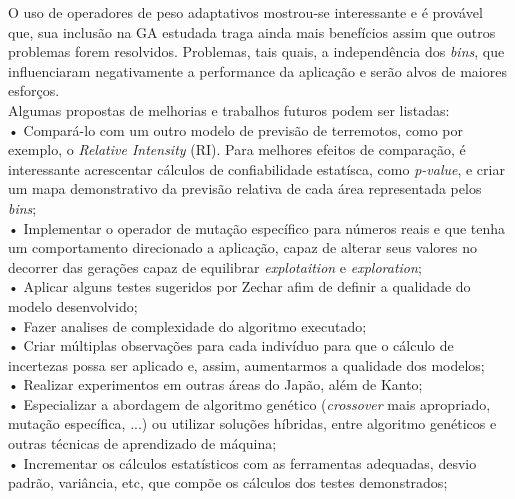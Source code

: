 O uso de operadores de peso adaptativos mostrou-se interessante e é provável que, sua inclusão na GA estudada traga ainda mais benefícios assim que outros problemas forem resolvidos. Problemas, tais quais, a independência dos {\it bins}, que influenciaram negativamente a performance da aplicação e serão alvos de maiores esforços.\\



Algumas propostas de melhorias e trabalhos futuros podem ser listadas:\\

• Compará-lo com um outro modelo de previsão de terremotos, como por exemplo, o {\it Relative Intensity} (RI). Para melhores efeitos de comparação, é interessante acrescentar cálculos de confiabilidade estatísca, como {\it p-value}, e criar um mapa demonstrativo da previsão relativa de cada área representada pelos {\it bins};\\%

• Implementar o operador de mutação específico para números reais e que tenha um comportamento direcionado a aplicação, capaz de alterar seus valores no decorrer das gerações capaz de equilibrar {\it explotaition} e {\it exploration};\\

• Aplicar alguns testes sugeridos por Zechar\cite{zechartheme} afim de definir a qualidade do modelo desenvolvido;\\

• Fazer analises de complexidade do algoritmo executado;\\

• Criar múltiplas observações para cada indivíduo para que o cálculo de incertezas possa ser aplicado e, assim, aumentarmos a qualidade dos modelos;\\

• Realizar experimentos em outras áreas do Japão, além de Kanto;\\

• Especializar a abordagem de algoritmo genético ({\it crossover} mais apropriado, mutação específica, ...) ou  utilizar soluções híbridas, entre algoritmo genéticos e outras técnicas de aprendizado de máquina;\\

• Incrementar os cálculos estatísticos com as ferramentas adequadas, desvio padrão, variância, etc, que compõe os cálculos dos testes demonstrados;\\

